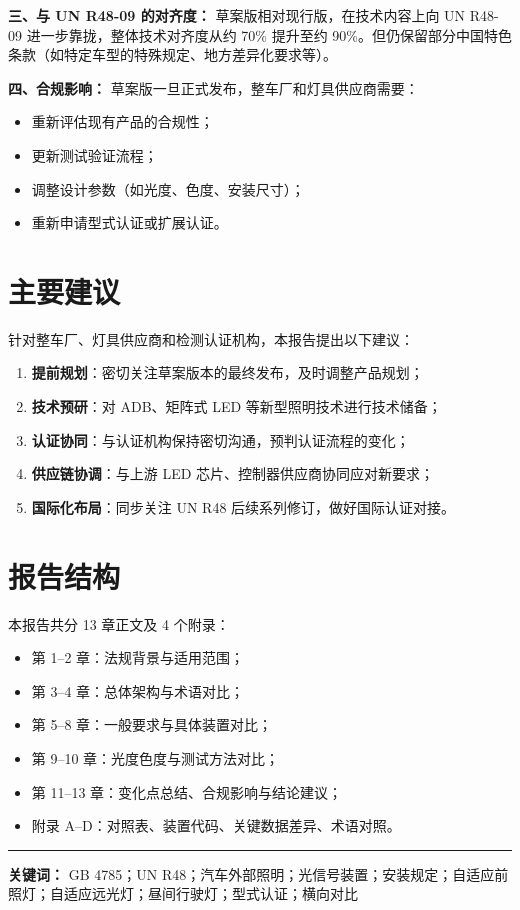 \textbf{三、与 UN R48-09 的对齐度：} 草案版相对现行版，在技术内容上向 UN R48-09 进一步靠拢，整体技术对齐度从约 70\% 提升至约 90\%。但仍保留部分中国特色条款（如特定车型的特殊规定、地方差异化要求等）。

\textbf{四、合规影响：} 草案版一旦正式发布，整车厂和灯具供应商需要：
\begin{itemize}[leftmargin=2em]
    \item 重新评估现有产品的合规性；
    \item 更新测试验证流程；
    \item 调整设计参数（如光度、色度、安装尺寸）；
    \item 重新申请型式认证或扩展认证。
\end{itemize}

\section*{主要建议}

针对整车厂、灯具供应商和检测认证机构，本报告提出以下建议：
\begin{enumerate}[leftmargin=2em]
    \item \textbf{提前规划}：密切关注草案版本的最终发布，及时调整产品规划；
    \item \textbf{技术预研}：对 ADB、矩阵式 LED 等新型照明技术进行技术储备；
    \item \textbf{认证协同}：与认证机构保持密切沟通，预判认证流程的变化；
    \item \textbf{供应链协调}：与上游 LED 芯片、控制器供应商协同应对新要求；
    \item \textbf{国际化布局}：同步关注 UN R48 后续系列修订，做好国际认证对接。
\end{enumerate}

\section*{报告结构}

本报告共分 13 章正文及 4 个附录：
\begin{itemize}[leftmargin=2em]
    \item 第 1--2 章：法规背景与适用范围；
    \item 第 3--4 章：总体架构与术语对比；
    \item 第 5--8 章：一般要求与具体装置对比；
    \item 第 9--10 章：光度色度与测试方法对比；
    \item 第 11--13 章：变化点总结、合规影响与结论建议；
    \item 附录 A--D：对照表、装置代码、关键数据差异、术语对照。
\end{itemize}

\vspace{2cm}
\noindent\rule{\textwidth}{0.5pt}

\textbf{关键词：} GB 4785；UN R48；汽车外部照明；光信号装置；安装规定；自适应前照灯；自适应远光灯；昼间行驶灯；型式认证；横向对比

\clearpage